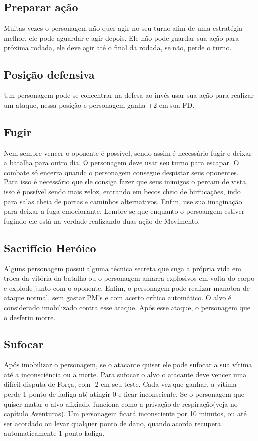 \subsection{Preparar ação}

Muitas vezes o personagem não quer agir no seu turno afim de uma estratégia melhor, ele pode aguardar e agir depois. Ele não pode guardar sua ação para próxima rodada, ele deve agir até o final da rodada, se não, perde o turno.

\subsection{Posição defensiva}

Um personagem pode se concentrar na defesa ao invés usar sua ação para realizar um ataque, nessa posição o personagem ganha +2 em sua FD.

\subsection{Fugir}

Nem sempre vencer o oponente é possível, sendo assim é necessário fugir e deixar a batalha para outro dia. O personagem deve usar seu turno para escapar. O combate só encerra quando o personagem consegue despistar seus oponentes. Para isso é necessário que ele consiga fazer que seus inimigos o percam de vista, isso é possível sendo mais veloz, entrando em becos cheio de birfucações, indo para salas cheia de portas e caminhos alternativos. Enfim, use sua imaginação para deixar a fuga emocionante. Lembre-se que enquanto o persoangem estiver fugindo ele está na verdade realizando duas ação de Movimento.

\subsection{Sacrifício Heróico}

Alguns personagem possui alguma técnica secreta que suga a própria vida em troca da vitória da batalha ou o personagem amarra explosivos em volta do corpo e explode junto com o oponente. Enfim, o personagem pode realizar manobra de ataque normal, sem gastar PM's e com acerto crítico automático. O alvo é considerado imobilizado contra esse ataque. Após esse ataque, o personagem que o desferiu morre.

\subsection{Sufocar}

Após imobilizar o personagem, se o atacante quiser ele pode sufocar a sua vítima até a inconsciência ou a morte. Para sufocar o alvo o atacante deve vencer uma difícil disputa de Força, com -2 em seu teste. Cada vez que ganhar, a vítima perde 1 ponto de fadiga até atingir 0 e ficar inconsciente. Se o personagem que quiser matar o alvo afixiado, funciona como a privação de respiração(veja no capítulo Aventuras). Um personagem ficará inconsciente por 10 minutos, ou até ser acordado ou levar qualquer ponto de dano, quando acorda recupera automaticamente 1 ponto fadiga. 

